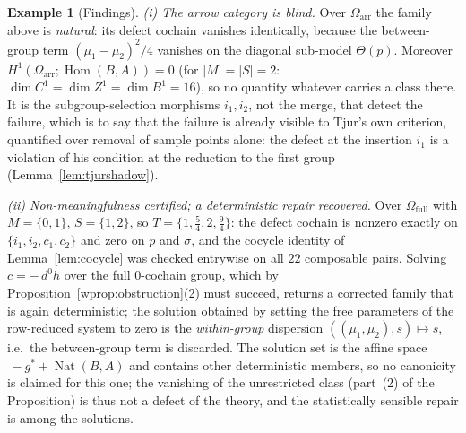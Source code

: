 \documentclass[11pt,a4paper]{article}
\theoremstyle{plain}
\theoremstyle{definition}
\newtheorem{example}[theorem]{Example}
\theoremstyle{remark}
\newcommand{\cat}[1]{\mathsf{#1}}
\newcommand{\catO}{\cat{\Omega}}
\DeclareMathOperator{\Nat}{Nat}
\DeclareMathOperator{\Hom}{Hom}
\begin{document}
\begin{example}[Findings]\label{ex:oneway-findings}
\emph{(i) The arrow category is blind.} Over $\catO_{\mathrm{arr}}$ the family
above is \emph{natural}: its defect cochain vanishes identically, because the
between-group term $(\mu_1-\mu_2)^2/4$ vanishes on the diagonal sub-model
$\Theta(p)$. Moreover $H^{1}(\catO_{\mathrm{arr}};\Hom(B,A)) = 0$ (for $|M| =
|S| = 2$: $\dim C^{1} = \dim Z^{1} = \dim B^{1} = 16$), so no quantity whatever
carries a class there. It is the subgroup-selection morphisms $i_1, i_2$, not
the merge, that detect the failure, which is to say that the failure is
already visible to Tjur's own criterion, quantified over removal of sample
points alone: the defect at the insertion $i_1$ is a violation of his
condition at the reduction to the first group (Lemma~\ref{lem:tjurshadow}).

\emph{(ii) Non-meaningfulness certified; a deterministic repair recovered.} Over
$\catO_{\mathrm{full}}$ with $M = \{0,1\}$, $S = \{1,2\}$, so $T =
\{1,\tfrac54,2,\tfrac94\}$: the defect cochain is nonzero exactly on
$\{i_1,i_2,c_1,c_2\}$ and zero on $p$ and $\sigma$, and the cocycle identity of
Lemma~\ref{lem:cocycle} was checked entrywise on all $22$ composable pairs.
Solving $c = -\,d^{0}h$ over the full $0$-cochain group, which by
Proposition~\ref{wprop:obstruction}(2) must succeed, returns a corrected
family that is again deterministic; the solution obtained by setting the free
parameters of the row-reduced system to zero is the \emph{within-group}
dispersion $((\mu_1,\mu_2),s) \mapsto s$, i.e.\ the between-group term is
discarded. The solution set is the affine space  $\,-g^{*} + \Nat(B,A)$ and
contains other deterministic members, so no canonicity is claimed for this
one; the vanishing of the unrestricted class (part~(2) of the Proposition)
is thus not a defect of the theory, and the statistically sensible repair is
among the solutions.


\end{example}
\end{document}
